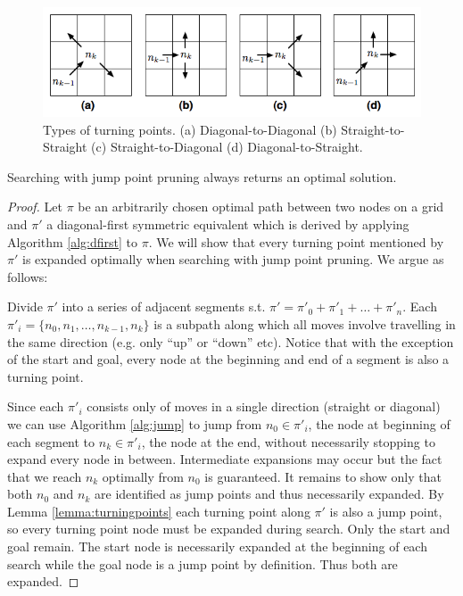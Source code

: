 \begin{figure}[tb]
       \begin{center}
		   \includegraphics[width=0.95\columnwidth, trim = 10mm 10mm 10mm 0mm]
			{diagrams/turningpoints.png}
       \end{center}
	\vspace{-3pt}
       \caption{Types of turning points. (a) Diagonal-to-Diagonal
(b) Straight-to-Straight (c) Straight-to-Diagonal (d) Diagonal-to-Straight.}
       \label{fig:turningpoints}
\end{figure}

\begin{theorem}
\label{theorem:jumping}
Searching with jump point pruning always returns an optimal solution. 
\end{theorem}
\begin{proof}
Let $\pi$ be an arbitrarily chosen optimal path between two nodes
on a grid and $\pi'$ a diagonal-first symmetric equivalent which is derived
by applying Algorithm \ref{alg:dfirst} to $\pi$.
We will show that every turning point mentioned by $\pi'$ is expanded optimally 
when searching with jump point pruning. We argue as follows:
\par
Divide $\pi'$ into a series of adjacent segments s.t. 
$\pi' = \pi'_{0} + \pi'_{1} + \ldots + \pi'_{n} $. Each $\pi'_{i} = \lbrace n_{0}, n_{1},
\ldots, n_{k-1}, n_{k} \rbrace$ is a subpath along which all moves involve
travelling in the same direction (e.g.  only ``up'' or ``down'' etc).  Notice
that with the exception of the start and goal, every node at the beginning and
end of a segment is also a turning point.
\par
Since each $\pi'_{i}$ consists only of moves in a single direction
(straight or diagonal) we can use Algorithm \ref{alg:jump} to jump from $n_{0}
\in \pi'_{i}$, the node at beginning of each segment to $n_{k} \in \pi'_{i}$, the
node at the end, without necessarily stopping to expand every node in between.
Intermediate expansions may occur but the fact that we reach $n_{k}$
optimally from $n_{0}$ is guaranteed.
It remains to show only that both $n_{0}$ and $n_{k}$ are identified as
jump points and thus necessarily expanded. 
By Lemma \ref{lemma:turningpoints} each turning point along $\pi'$ is 
also a jump point, so every turning point node must be expanded during search.
Only the start and goal remain. The start node is necessarily expanded at the
beginning of each search while the goal node is a jump point by definition.
Thus both are expanded.
\end{proof}
